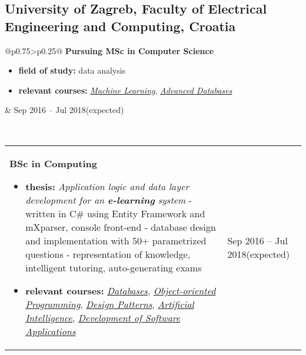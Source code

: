 \documentclass[a4paper]{article}
\makeatletter
\newlength{\tablewidth}
\newenvironment{period}[2]{%
\newcommand{\sarma}{#2}%
\setlength{\tablewidth}{\linewidth}
\addtolength{\tablewidth}{-2\tabcolsep}
\begin{tabular}{@{}p{0.75\tablewidth}>{\raggedleft\arraybackslash}p{0.25\tablewidth}@{}}%
#1 \newline
\begin{itemize}
}{%
\end{itemize} & \sarma \\%
\end{tabular}\\
}
\makeatother
\begin{document}
\subsection{University of Zagreb, Faculty of Electrical Engineering and Computing, Croatia}
\begin{period}{\textbf{Pursuing MSc in Computer Science}}{Sep 2016 -- Jul 2018\linebreak(expected)}
    \item \textbf{field of study:}
        data analysis
    \item \textbf{relevant courses:}
	    \textit{\href{%
	    	}{Machine Learning}},
	    \textit{\href{%
	    	}{Advanced Databases}}
\end{period}
\begin{period}{\textbf{BSc in Computing}}{Sep 2013 -- Jul 2016}
    \item \textbf{thesis:}
        \textit{Application logic and data layer development for an \textbf{e-learning} system}
        \newline - written in C\# using Entity Framework and mXparser, console front-end 
        \newline - database design and implementation with 50+ parametrized questions
        \newline - representation of knowledge, intelligent tutoring, auto-generating exams
        
    \item \textbf{relevant courses:}
	    \textit{\href{%
	    		}{Databases}},
		\textit{\href{%
				}{Object-oriented Programming}},
		\textit{\href{%
			}{Design Patterns}},
		\textit{\href{%
				}{Artificial Intelligence}},
		\textit{\href{%
				}{Development of Software Applications}}
		
\end{period}
\end{document}
